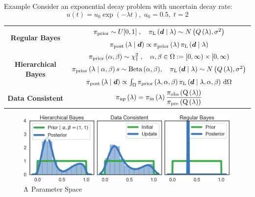 \vspace{-0.75cm}
\begin{block}{Example}
\centering
Consider an exponential decay problem with uncertain decay rate:
\begin{equation*}
       u(t) = u_0\exp(-\lambda t), \; u_0 = 0.5 ,\; t=2
   \end{equation*}
\vspace{-0.25cm}

\begin{tabular}{c|c}
\toprule
\multirow{2}{*}{\textbf{Regular Bayes}} & 
$\prior \sim U[0,1]\; , \quad  \likelihood\qGivelam\sim N\left(Q\lam,\sigma^2\right) $ \\
                                        & $\bayes$ \\ 
\midrule
\multirow{3}{*}{\textbf{Hierarchical Bayes}}   &
        $\prior\hyper \sim \chi^2_1\; , \quad \alpha,\beta\in\Omega :=[0,\infty)\times[0,\infty)$ \\
        & $\prior\lamGiveH s\sim \text{Beta}\hyper, \quad \likelihood\qGivelam \sim N\left(Q\lam,\sigma^2\right)$ \\
        & $\Hbayes$ \\
\midrule
\textbf{Data Consistent} &  $\dci$\\
\bottomrule
\end{tabular}
\vspace{1.cm}
\begin{figure}
        \includegraphics[width=32cm]{figures/distr_EX_lambda_space.png}
        \vspace{-0.5cm}
        \centering
        \caption{\large $\pspace$ Parameter Space }
\end{figure}
\vspace{-0.5cm}

\end{block}
